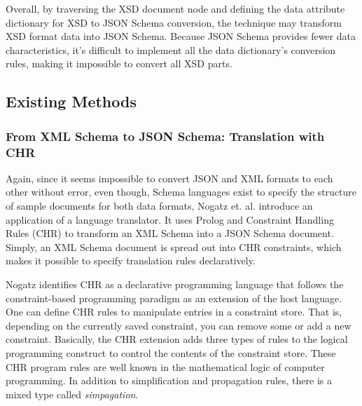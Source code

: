 Overall, by traversing the XSD document node and defining the data attribute
dictionary for XSD to JSON Schema conversion, the technique may transform XSD
format data into JSON Schema. Because JSON Schema provides fewer data
characteristics, it's difficult to implement all the data dictionary's
conversion rules, making it impossible to convert all XSD parts.

\subsection{Existing Methods}
\subsubsection{From XML Schema to JSON Schema: Translation with CHR}
Again, since it seems impossible to convert JSON and XML formats to each other
without error, even though, Schema languages exist to specify the structure of
sample documents for both data formats, Nogatz et. al. \autocite{Nogatz2014}
introduce an application of a language translator. It uses Prolog and Constraint
Handling Rules (CHR) to transform an XML Schema into a JSON Schema document.
Simply, an XML Schema document is spread out into CHR constraints, which makes
it possible to specify translation rules declaratively.

Nogatz identifies CHR as a declarative programming language that follows the
constraint-based programming paradigm as an extension of the host language. One
can define CHR rules to manipulate entries in a constraint store. That is,
depending on the currently saved constraint, you can remove some or add a new
constraint. Basically, the CHR extension adds three types of rules to the
logical programming construct to control the contents of the constraint store.
These CHR program rules are well known in the mathematical logic of computer
programming. In addition to simplification and propagation rules, there is a
mixed type called \emph{simpagation}. 

